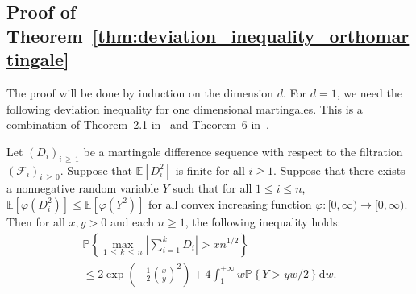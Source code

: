 \documentclass[10pt]{amsart}
\theoremstyle{definition}\newtheorem{defi}[theo]{Definition}\newtheorem{rema}[theo]{Remark}\newtheorem{exam}[theo]{Example}\newtheorem{exem}[theo]{Example}\newtheorem{nota}[theo]{Notation}
\newcommand{\Fca}{\mathcal{F}}
\newcommand{\rmd}{\mathrm{d}}
\newcommand\PP{\mathbb{P}}
\newcommand{\E}[1]{\mathbb E[#1]}
\newcommand{\pr}[1]{(#1)}
\begin{document}
\subsection{Proof of Theorem~\ref{thm:deviation_inequality_orthomartingale}}

The proof will be done by induction on the dimension $d$. For $d=1$, we need the following deviation inequality for one dimensional martingales. This is a combination of Theorem~2.1 in~\cite{MR3311214} and Theorem~6 in~\cite{MR606989}.

\begin{prop}\label{prop:inegalite_deviation_martingales_dominee}
Let $\pr{D_i}_{i\,\geq\,1}$ be a martingale difference sequence with respect to the filtration $\pr{\Fca_i}_{i\,\geq\,0}$. Suppose that $\E{D_i ^2}$ is finite for all $i\geq 1$. Suppose that there exists a nonnegative random variable $Y$ such that for all $1\leq i\leq n$, $\E{\varphi\pr{D_i^2}}\leq\E{\varphi\pr{Y^2}}$ for all convex increasing function $\varphi\colon [0,\infty)\to[0,\infty)$. Then for all $x,y>0$ and each $n\geq 1$, the following inequality holds:
\begin{multline}\label{eq:inegalite_max_martingales_moments_ordre_p_domination_sto}
\PP\left\{\max_{1\,\leq\,k\,\leq\,n}\left|\sum_{i=1}^kD_i\right|>x n^{1/2} \right\}
\\
\leq 2\exp\left(-\frac 12\left(\frac{x}{y}\right)^{2} \right)
+ 4\int_{1 }^{+\infty}w\PP\left\{ Y>yw/2\right\}\rmd w.
\end{multline}
\end{prop}
\end{document}
